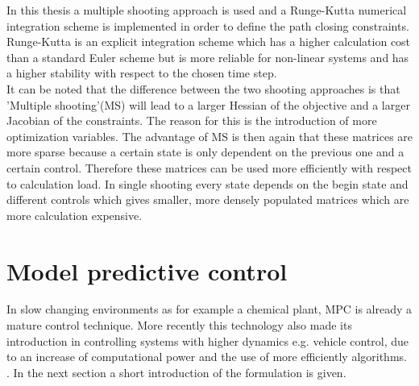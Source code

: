 In this thesis a multiple shooting approach is used and a Runge-Kutta numerical integration scheme is implemented in order to define the path closing constraints. Runge-Kutta is an explicit integration scheme which has a higher calculation cost than a standard Euler scheme but is more reliable for non-linear systems and has a higher stability with respect to the chosen time step. \cite{Mercy2018}\\ 

It can be noted that the difference between the two shooting approaches is that 'Multiple shooting'(MS) will lead to a larger Hessian of the objective and a larger Jacobian of the constraints. The reason for this is the introduction of more optimization variables. The advantage of MS is then again that these matrices are more sparse because a certain state is only dependent on the previous one and a certain control. Therefore these matrices can be used more efficiently with respect to calculation load. In single shooting every state depends on the begin state and different controls which gives smaller, more densely populated matrices which are more calculation expensive. \cite{Gillis2019}

\section{Model predictive control}
\label{s:MPC_e}
In slow changing environments as for example a chemical plant, MPC is already a mature control technique. More recently this technology also made its introduction in controlling systems with higher dynamics e.g. vehicle control, due to an increase of computational power and the use of more efficiently algorithms. \cite{Mercy2018}. In the next section a short introduction of the formulation is given. \\

